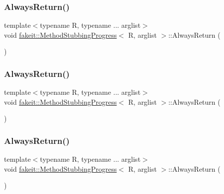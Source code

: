 \subsubsection{\texorpdfstring{AlwaysReturn()}{AlwaysReturn()}\hspace{0.1cm}{\footnotesize\ttfamily [10/27]}}
{\footnotesize\ttfamily template$<$typename R, typename ... arglist$>$ \\
void \mbox{\hyperlink{structfakeit_1_1MethodStubbingProgress}{fakeit\+::\+Method\+Stubbing\+Progress}}$<$ R, arglist $>$\+::Always\+Return (\begin{DoxyParamCaption}{ }\end{DoxyParamCaption})\hspace{0.3cm}{\ttfamily [inline]}}

\mbox{\label{structfakeit_1_1MethodStubbingProgress_a3f1ecf87f8c73b7f3276786914579f8b}} 
\subsubsection{\texorpdfstring{AlwaysReturn()}{AlwaysReturn()}\hspace{0.1cm}{\footnotesize\ttfamily [11/27]}}
{\footnotesize\ttfamily template$<$typename R, typename ... arglist$>$ \\
void \mbox{\hyperlink{structfakeit_1_1MethodStubbingProgress}{fakeit\+::\+Method\+Stubbing\+Progress}}$<$ R, arglist $>$\+::Always\+Return (\begin{DoxyParamCaption}{ }\end{DoxyParamCaption})\hspace{0.3cm}{\ttfamily [inline]}}

\mbox{\label{structfakeit_1_1MethodStubbingProgress_a3f1ecf87f8c73b7f3276786914579f8b}} 
\subsubsection{\texorpdfstring{AlwaysReturn()}{AlwaysReturn()}\hspace{0.1cm}{\footnotesize\ttfamily [12/27]}}
{\footnotesize\ttfamily template$<$typename R, typename ... arglist$>$ \\
void \mbox{\hyperlink{structfakeit_1_1MethodStubbingProgress}{fakeit\+::\+Method\+Stubbing\+Progress}}$<$ R, arglist $>$\+::Always\+Return (\begin{DoxyParamCaption}{ }\end{DoxyParamCaption})\hspace{0.3cm}{\ttfamily [inline]}}

